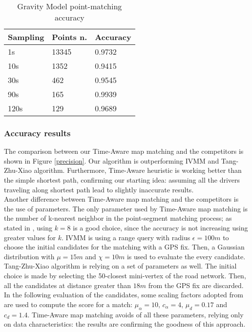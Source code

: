 \documentclass[5p]{elsarticle}
\begin{document}
\begin{center}
\begin{table}[h!]
\begin{tabular}{|l|l|l|}
\hline
\textbf{Sampling} & \textbf{Points n.} & \textbf{Accuracy} \\ \hline
1s                & 13345              & 0.9732    \\ \hline
10s               & 1352               & 0.9415    \\ \hline
30s               & 462                & 0.9545    \\ \hline
90s               & 165                & 0.9939   \\ \hline
120s              & 129                & 0.9689    \\ \hline
\end{tabular}
\caption{Gravity Model point-matching accuracy}
\label{gravity-accuracy}
\end{table}
\end{center}

\subsubsection{Accuracy results}
The comparison between our Time-Aware map matching and the competitors is shown in Figure \ref{precision}. Our algorithm is outperforming IVMM and Tang-Zhu-Xiao algorithm. 
Furthermore, Time-Aware heuristic is working better than the simple shortest path, confirming our starting idea: 
assuming all the drivers traveling along shortest path lead to slightly inaccurate
results. 
\\
Another difference between Time-Aware map matching and the competitors is the use of parameters. The only parameter used by Time-Aware map matching is 
the number of k-nearest neighbor in the point-segment matching process; as stated in \cite{cintia2013gravity}, using $k=8$ is a good choice, since the accuracy is not increasing 
using greater values for $k$. IVMM is using a range query with radius $\epsilon = 100m$ to choose the initial candidates for the matching with a GPS fix.  
Then, a Gaussian distribution with $\mu = 15m$ and $\chi = 10m$ is used to evaluate the every candidate. Tang-Zhu-Xiao algorithm is relying on a set of parameters as well. 
The initial choice is made by selecting the 50-closest mini-vertex of the road network. Then, all the candidates at distance greater than $18m$ from the GPS fix are discarded.
In the following evaluation of the candidates, some scaling factors adopted from \cite{brakatsoulas2005map} are used to compute the score for a match:  $\mu_{\alpha}=10$, $c_{\alpha}=4$, $\mu_{d}=0.17$ and $c_
{d}=1.4$. Time-Aware map matching avoids of all these parameters, relying only on data characteristics: the results are confirming the goodness of this approach.  
\end{document}
